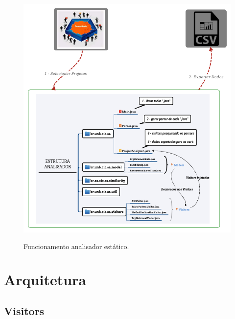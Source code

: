 	\begin{figure}[h]
		\center
		\includegraphics[scale=0.52]{Imagens/Arquitetura}
		\label{fig:Arquitetura}
		\caption{Funcionamento analisador estático.}
	\end{figure}


\section{Arquitetura}

\subsection{Visitors}


